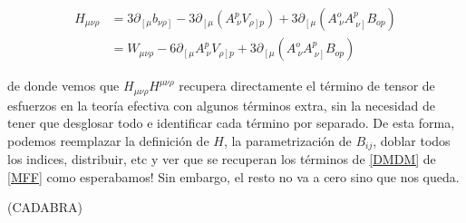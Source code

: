 \documentclass{article}
\numberwithin{equation}{section}
\begin{document}
\begin{equation}
\begin{aligned}
H_{\mu \nu \rho} &= 3 \partial_{\left[\mu\right. } b_{\left.\nu \rho \right]} 
- 3 \partial_{\left[\mu\right.} \left( A^p_{\ \nu} V_{\left. \rho \right] p}\right)
+ 3 \partial_{\left[\mu\right.} \left( A^o_{\ \nu} A^p_{ \ \left. \nu \right]} B_{o p} \right)\\
&= W_{\mu \nu \rho} -6 \partial_{\left[ \mu\right.} A^p_{\ \nu} V_{\left.\rho\right] p} + 3 \partial_{\left[\mu\right.} \left( A^o_{\ \nu} A^p_{ \ \left. \nu \right]} B_{o p} \right)
\end{aligned}
\end{equation}

de donde vemos que $ H_{\mu \nu \rho} H^{\mu \nu \rho} $  recupera directamente el término de tensor de esfuerzos en la teoría efectiva con algunos términos extra, sin la necesidad de tener que desglosar todo e identificar cada término por separado. De esta forma, podemos reemplazar la definición de $ H $, la parametrización de $ B_{i j} $, doblar todos los indices, distribuir, etc y ver que se recuperan los términos de \ref{DMDM} de \ref{MFF} como esperabamos! Sin embargo, el resto no va a cero sino que nos queda. 

\vspace{5cm}
(CADABRA) 
\end{document}
